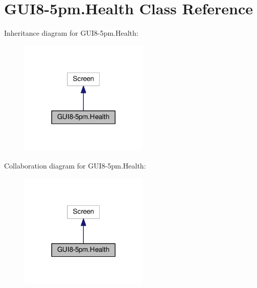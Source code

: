 \hypertarget{classGUI8-5pm_1_1Health}{}\section{G\+U\+I8-\/5pm.Health Class Reference}
\label{classGUI8-5pm_1_1Health}


Inheritance diagram for G\+U\+I8-\/5pm.Health\+:\nopagebreak
\begin{figure}[H]
\begin{center}
\leavevmode
\includegraphics[width=173pt]{classGUI8-5pm_1_1Health__inherit__graph}
\end{center}
\end{figure}


Collaboration diagram for G\+U\+I8-\/5pm.Health\+:\nopagebreak
\begin{figure}[H]
\begin{center}
\leavevmode
\includegraphics[width=173pt]{classGUI8-5pm_1_1Health__coll__graph}
\end{center}
\end{figure}
